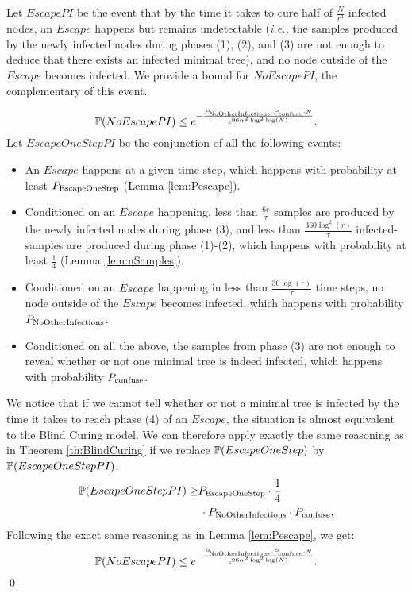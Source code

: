 \begin{lemma} \label{lem:timePconfuse} 
Let $EscapePI$ be the event that by the time it takes to cure half of $\frac{N}{r^4}$ infected nodes, an $Escape$ happens but remains undetectable (\textit{i.e.,} the samples produced by the newly infected nodes during phases (1), (2), and (3) are not enough to deduce that there exists an infected minimal tree), and no node outside of the $Escape$ becomes infected. We provide a bound for $NoEscapePI$, the complementary of this event.

$$ \mathbb{P}(NoEscapePI) \leq e^{-\frac{P_{\rm NoOtherInfections} \cdot P_{\rm confuse} \cdot N}{e^{96\alpha^2\log^2\log(N)}}}.$$
\proof Let $EscapeOneStepPI$ be the conjunction of all the following events:
\begin{itemize}
	\item An $Escape$ happens at a given time step, which happens with probability at least $P_{\rm EscapeOneStep}$ (Lemma \ref{lem:Pescape}).
	\item Conditioned on an $Escape$ happening, less than $\frac{6r}{\tau}$ samples are produced by the newly infected nodes during phase (3), and less than $\frac{360\log^2(r)}{\tau}$ infected-samples are produced during phase (1)-(2), which happens with probability at least $\frac{1}{4}$ (Lemma \ref{lem:nSamples}).
	\item Conditioned on an $Escape$ happening in less than $\frac{30\log(r)}{\tau}$ time steps, no node outside of the $Escape$ becomes infected, which happens with probability $P_{\rm NoOtherInfections}$.
    \item Conditioned on all the above, the samples from phase (3) are not enough to reveal whether or not one minimal tree is indeed infected, which happens with probability $P_{\rm confuse}$.
\end{itemize} 
We notice that if we cannot tell whether or not a minimal tree is infected by the time it takes to reach phase (4) of an $Escape$, the situation is almost equivalent to the Blind Curing model. We can therefore apply exactly the same reasoning as in Theorem \ref{th:BlindCuring} if we replace $\mathbb{P}(EscapeOneStep)$ by $\mathbb{P}(EscapeOneStepPI)$. 
\begin{align*} 
\mathbb{P}(EscapeOneStepPI) \geq &P_{\rm EscapeOneStep} \cdot \frac{1}{4}  \\
&\, \cdot P_{\rm NoOtherInfections} \cdot P_{\rm confuse},
 \end{align*}
Following the exact same reasoning as in Lemma \ref{lem:Pescape}, we get:
$$ \mathbb{P}(NoEscapePI) \leq e^{-\frac{P_{\rm NoOtherInfections} \cdot P_{\rm confuse} \cdot N}{e^{96\alpha^2\log^2\log(N)}}}.$$
\qed
\end{lemma}

